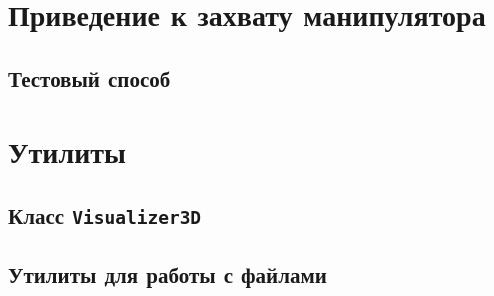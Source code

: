 \documentclass[12pt, a4paper]{article}
\begin{document}
\section{Приведение к захвату манипулятора}
\subsection{Тестовый способ}


\section{Утилиты}

\subsection{Класс \texttt{Visualizer3D}}


\subsection{Утилиты для работы с файлами}


\printbibliography
% 
% 
  
\end{document}
